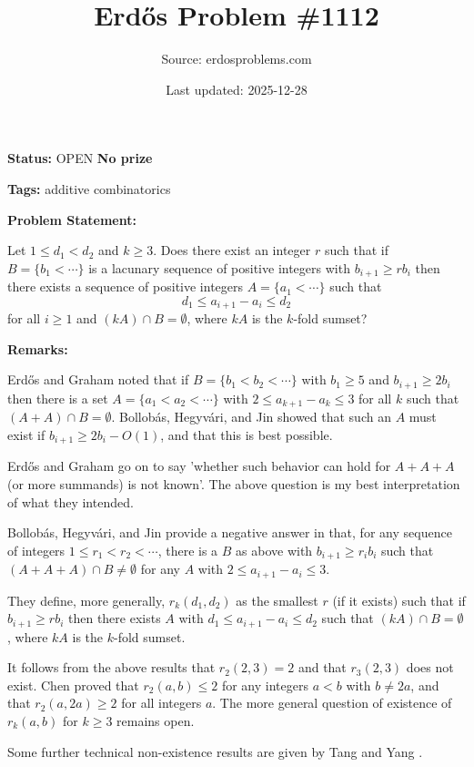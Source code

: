 \documentclass{article}
\title{Erd\H{o}s Problem \#1112}
\date{Last updated: 2025-12-28}
\author{Source: erdosproblems.com}
\begin{document}
\maketitle

\noindent\textbf{Status:} OPEN \quad \textbf{No prize}

\noindent\textbf{Tags:} additive combinatorics

\medskip
\noindent\textbf{Problem Statement:}

Let $1\leq d_1<d_2$ and $k\geq 3$. Does there exist an integer $r$ such that if $B=\{b_1<\cdots\}$ is a lacunary sequence of positive integers with $b_{i+1}\geq rb_i$ then there exists a sequence of positive integers $A=\{a_1<\cdots\}$ such that\[d_1\leq a_{i+1}-a_i\leq d_2\]for all $i\geq 1$ and $(kA)\cap B=\emptyset$, where $kA$ is the $k$-fold sumset?

\bigskip
\noindent\textbf{Remarks:}

Erd\H{o}s and Graham \cite{ErGr80} noted that if $B=\{b_1<b_2<\cdots\}$ with $b_1\geq 5$ and $b_{i+1}\geq 2b_i$ then there is a set $A=\{a_1<a_2<\cdots\}$ with $2\leq a_{k+1}-a_k\leq 3$ for all $k$ such that $(A+A)\cap B=\emptyset$. Bollob\'{a}s, Hegyv\'{a}ri, and Jin \cite{BHJ97} showed that such an $A$ must exist if $b_{i+1}\geq 2b_i-O(1)$, and that this is best possible.

Erd\H{o}s and Graham go on to say 'whether such behavior can hold for $A+A+A$ (or more summands) is not known'. The above question is my best interpretation of what they intended.

Bollob\'{a}s, Hegyv\'{a}ri, and Jin \cite{BHJ97} provide a negative answer in that, for any sequence of integers $1\leq r_1<r_2<\cdots$, there is a $B$ as above with $b_{i+1}\geq r_ib_i$ such that $(A+A+A)\cap B\neq\emptyset$ for any $A$ with $2\leq a_{i+1}-a_i\leq 3$.

They define, more generally, $r_k(d_1,d_2)$ as the smallest $r$ (if it exists) such that if $b_{i+1}\geq rb_i$ then there exists $A$ with $d_1\leq a_{i+1}-a_i\leq d_2$ such that $(kA)\cap B=\emptyset$, where $kA$ is the $k$-fold sumset.

It follows from the above results that $r_2(2,3)=2$ and that $r_3(2,3)$ does not exist. Chen \cite{Ch00} proved that $r_2(a,b)\leq 2$ for any integers $a<b$ with $b\neq 2a$, and that $r_2(a,2a)\geq 2$ for all integers $a$. The more general question of existence of $r_k(a,b)$ for $k\geq 3$ remains open.

Some further technical non-existence results are given by Tang and Yang \cite{TaYa21}.
\end{document}
